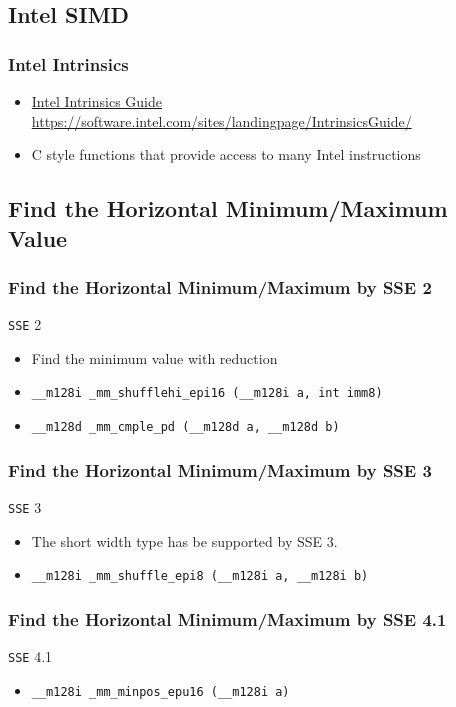 \subsection{Intel SIMD}
\begin{frame}
	\frametitle{Intel Intrinsics}
	\hypersetup{colorlinks,linkcolor=blue,urlcolor=links}
	\begin{itemize}
		\setlength\itemsep{1em}
		\item 
			\href{https://software.intel.com/sites/landingpage/IntrinsicsGuide/}{Intel Intrinsics Guide} \\
			\url{https://software.intel.com/sites/landingpage/IntrinsicsGuide/}
		\item
			C style functions that provide access to many Intel
			instructions
	\end{itemize}
\end{frame}

\subsection{Find the Horizontal Minimum/Maximum Value}
\begin{frame}
	\frametitle{Find the Horizontal Minimum/Maximum by SSE 2}
	{\tt SSE} 2
	\begin{itemize}
		\setlength\itemsep{1em}
		\item
			Find the minimum value with reduction
		\item
			\texttt{\_\_m128i \_mm\_shufflehi\_epi16 (\_\_m128i a, int imm8)}
		\item
			\texttt{\_\_m128d \_mm\_cmple\_pd (\_\_m128d a, \_\_m128d b)}
	\end{itemize}
\end{frame}

\begin{frame}
	\frametitle{Find the Horizontal Minimum/Maximum by SSE 3}
	{\tt SSE} 3
	\begin{itemize}
		\setlength\itemsep{1em}
		\item 
			The short width type has be supported by SSE 3.
		\item
			\texttt{\_\_m128i \_mm\_shuffle\_epi8 (\_\_m128i a, \_\_m128i b)}
	\end{itemize}
\end{frame}

\begin{frame}
	\frametitle{Find the Horizontal Minimum/Maximum by SSE 4.1}
	{\tt SSE} 4.1
	\begin{itemize}
		\setlength\itemsep{1em}
		\item
			\texttt{\_\_m128i \_mm\_minpos\_epu16 (\_\_m128i a)}
	\end{itemize}
	
\end{frame}

